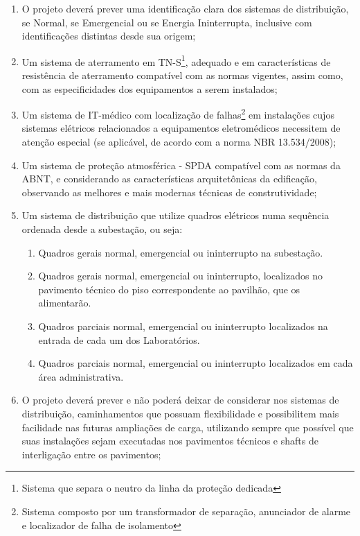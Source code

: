 \begin{enumerate}
	\item O projeto deverá prever uma identificação clara dos sistemas de distribuição, se Normal, se Emergencial ou se Energia Ininterrupta, inclusive com identificações distintas desde sua origem;
	
	\item Um sistema de aterramento em TN-S\footnote{Sistema que separa o neutro da linha da proteção dedicada}, adequado e em características de resistência de aterramento compatível com as normas vigentes, assim como, com as especificidades dos equipamentos a serem instalados;
	
	\item Um sistema de IT-médico com localização de falhas\footnote{Sistema composto por um transformador de separação, anunciador de alarme e localizador de falha de isolamento} em instalações cujos sistemas elétricos relacionados a equipamentos eletromédicos necessitem de atenção especial (se aplicável, de acordo com a norma NBR 13.534/2008); 
	
	\item Um sistema de proteção atmosférica - SPDA compatível com as normas da ABNT, e considerando as características arquitetônicas da edificação, observando as melhores e mais modernas técnicas de construtividade;
	
	\item Um sistema de distribuição que utilize quadros elétricos numa sequência ordenada desde a subestação, ou seja:
		\begin{enumerate}
			\item Quadros gerais normal, emergencial ou ininterrupto na subestação.
			\item Quadros gerais normal, emergencial ou ininterrupto, localizados no pavimento técnico do piso correspondente ao pavilhão, que os alimentarão.
			\item Quadros parciais normal, emergencial ou ininterrupto localizados na entrada de cada um dos Laboratórios.
			\item Quadros parciais normal, emergencial ou ininterrupto localizados em cada área administrativa.
		\end{enumerate}
	
	\item O projeto deverá prever e não poderá deixar de considerar nos sistemas de distribuição, caminhamentos que possuam flexibilidade e possibilitem mais facilidade nas futuras ampliações de carga, utilizando sempre que possível que suas instalações sejam executadas nos pavimentos técnicos e shafts de interligação entre os pavimentos;
	

\end{enumerate}
